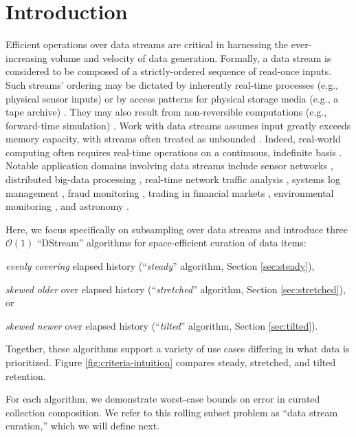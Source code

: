 \section{Introduction} \label{sec:introduction}

Efficient operations over data streams are critical in harnessing the ever-increasing volume and velocity of data generation.
Formally, a data stream is considered to be composed of a strictly-ordered sequence of read-once inputs.
Such streams' ordering may be dictated by inherently real-time processes (e.g., physical sensor inputs) or by access patterns for physical storage media (e.g., a tape archive) \citep{henzinger1998computing}.
They may also result from non-reversible computations (e.g., forward-time simulation) \citep{abdulla2004simulation,schutzel2014stream}.
Work with data streams assumes input greatly exceeds memory capacity, with streams often treated as unbounded \citep{jiang2006research}.
Indeed, real-world computing often requires real-time operations on a continuous, indefinite basis \citep{cordeiro2016online}.
Notable application domains involving data streams include sensor networks \citep{elnahrawy2003research}, distributed big-data processing \citep{he2010comet}, real-time network traffic analysis \citep{johnson2005streams,muthukrishnan2005data}, systems log management \citep{fischer2012real}, fraud monitoring \citep{rajeshwari2016real}, trading in financial markets \citep{agarwal2009faster}, environmental monitoring \citep{hill2009real}, and astronomy \citep{graham2012data}.

Here, we focus specifically on subsampling over data streams and introduce three $\mathcal{O}(1)$ ``DStream'' algorithms for space-efficient curation of data items:
\begin{enumerate*}
\item \textit{evenly covering} elapsed history (``\textit{steady}'' algorithm, Section \ref{sec:steady}),
\item \textit{skewed older} over elapsed history (``\textit{stretched}'' algorithm, Section \ref{sec:stretched}), or
\item \textit{skewed newer} over elapsed history (``\textit{tilted}'' algorithm, Section \ref{sec:tilted}).
\end{enumerate*}
Together, these algorithms support a variety of use cases differing in what data is prioritized.
Figure \ref{fig:criteria-intuition} compares steady, stretched, and tilted retention.

For each algorithm, we demonstrate worst-case bounds on error in curated collection composition.
We refer to this rolling subset problem as ``data stream curation,'' which we will define next.






